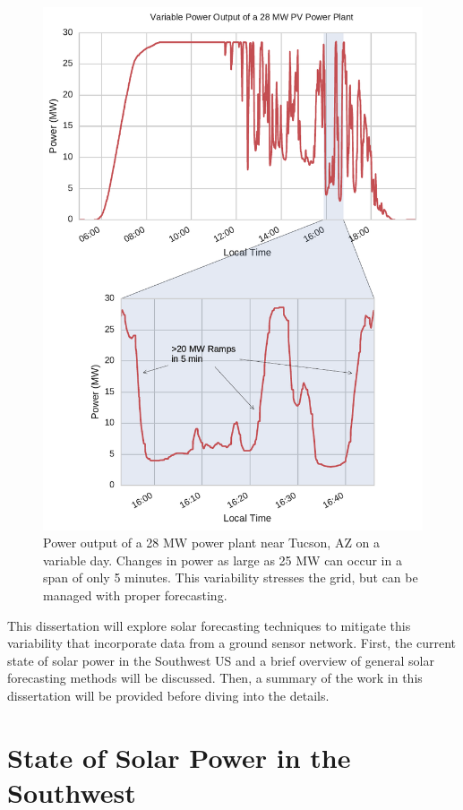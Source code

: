 \begin{figure}[h]
\centering
\includegraphics[width=.9\textwidth]{figs/avalon_ramps.pdf}
\caption[Variable power output of a 28 MW solar power plant]{
Power output of a 28 MW power plant near Tucson, AZ on a variable
day. Changes in power as large as 25 MW can occur in a span of only 5
minutes. This variability stresses the grid, but can be managed with
proper forecasting.}
\label{fig:variability_example}
\end{figure}

This dissertation will explore solar forecasting techniques to
mitigate this variability that incorporate data from a ground sensor
network.
First, the current state of solar power in the Southwest US and a
brief overview of general solar forecasting methods will be
discussed.
Then, a summary of the work in this dissertation will be provided
before diving into the details.

\section{State of Solar Power in the Southwest}

